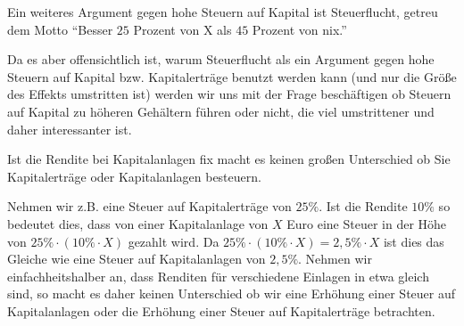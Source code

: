 \begin{remark}
	Ein weiteres Argument gegen hohe Steuern auf Kapital ist
	Steuerflucht, getreu dem Motto \enquote{Besser $25$ Prozent von X als $45$ Prozent
		von nix.}
\end{remark}


Da es aber offensichtlich ist, warum Steuerflucht als ein Argument gegen
hohe Steuern auf Kapital bzw. Kapitalerträge benutzt werden kann (und
nur die Größe des Effekts umstritten ist) werden wir uns mit der Frage
beschäftigen ob Steuern auf Kapital zu höheren Gehältern führen oder
nicht, die viel umstrittener und daher interessanter ist.


\begin{remark}
	Ist die Rendite bei Kapitalanlagen fix macht es keinen
	großen Unterschied ob Sie Kapitalerträge oder Kapitalanlagen besteuern.
\end{remark}
\begin{example}
	Nehmen wir z.B. eine Steuer auf Kapitalerträge von $25\%$. Ist die Rendite
	$10\%$ so bedeutet dies, dass von einer Kapitalanlage von $X$ Euro eine Steuer
	in der Höhe von $25\%\cdot (10\%\cdot X)$ gezahlt wird. Da $25\%\cdot (10\%\cdot X) = 2,5\%\cdot X$
	ist dies das Gleiche wie eine Steuer auf Kapitalanlagen von $2,5\%$.
	Nehmen wir einfachheitshalber an, dass Renditen für verschiedene Einlagen
	in etwa gleich sind, so macht es daher keinen Unterschied ob wir eine
	Erhöhung einer Steuer auf Kapitalanlagen oder die Erhöhung einer Steuer
	auf Kapitalerträge betrachten.
\end{example}
